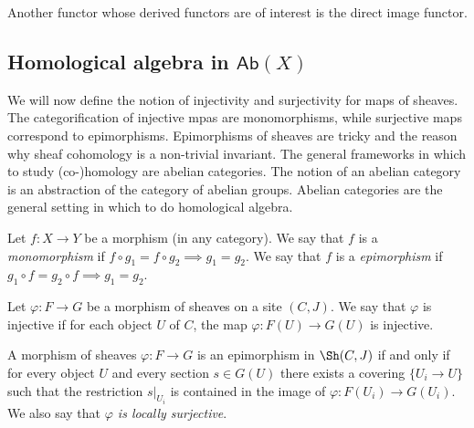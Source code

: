Another functor whose derived functors are of interest is the direct image functor.

\subsection{Homological algebra in \texorpdfstring{$\mathsf{Ab}(X)$}{Ab(X)}}

We will now define the notion of injectivity and surjectivity for maps of sheaves. The categorification of injective mpas are monomorphisms, while surjective maps correspond to epimorphisms. Epimorphisms of sheaves are tricky and the reason why sheaf cohomology is a non-trivial invariant. The general frameworks in which to study (co-)homology are abelian categories. The notion of an abelian category is an abstraction of the category of abelian groups. Abelian categories are the general setting in which to do homological algebra.

\begin{definition}
	Let $f: X \to Y$ be a morphism (in any category). We say that $f$ is a \textit{monomorphism} if $f \circ g_1 = f \circ g_2 \implies g_1 = g_2$.
	We say that $f$ is a \textit{epimorphism} if $g_1 \circ  f  = g_2 \circ f \implies g_1 = g_2$.
\end{definition}

\begin{proposition}[Monomorphisms in $\sh(C,J)$]
	Let $\varphi: F \to G$ be a morphism of sheaves on a site $(C,J)$. We say that $\varphi$ is injective if for each object $U$ of $C$, the map $\varphi: F(U) \to G(U)$ is injective.
\end{proposition}

\begin{proposition}[Epimorphisms in $\sh(C,J)$]
	A morphism of sheaves $\varphi: F \to G$ is an epimorphism in $\Sh(C,J)$ if and only if for every object $U$ and every section $s \in G(U)$ there exists a covering $\{U_i \to U\}$ such that the restriction $s|_{U_i}$ is contained in the image of $\varphi: F(U_i) \to G(U_i)$. We also say that \textit{$\varphi$ is locally surjective}.
\end{proposition}

